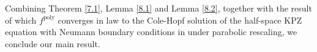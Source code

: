 \documentclass[10pt]{article}
\begin{document}
Combining Theorem \ref{7.1}, Lemma \ref{8.1} and Lemma \ref{8.2}, together with the result of which $f^{\text{poly}}$ converges in law to the Cole-Hopf solution of the half-space KPZ equation with Neumann boundary conditions in \cite{Wu20} under parabolic rescaling, we conclude our main result.











    

\printbibliography[title={Bibliography}]
\end{document}
